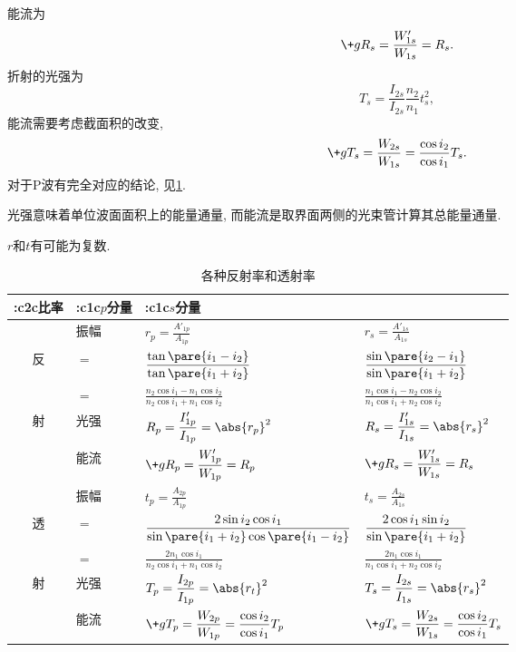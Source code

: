 \documentclass{ctexart}
\begin{document}
能流为
\[ \+gR_s = \frac{W'_{1s}}{W_{1s}} = R_s. \]
折射的光强为
\[ T_s = \frac{I_{2s}}{I_{2s}}{\frac{n_2}{n_1}}t_s^2, \]
能流需要考虑截面积的改变,
\[ \+gT_s = \frac{W_{2s}}{W_{1s}} = \frac{\cos i_2}{\cos i_1} T_s. \]
对于P波有完全对应的结论, 见\cref{table:各种反射率和透射率}.
\begin{pitfall}
    光强意味着单位波面面积上的能量通量, 而能流是取界面两侧的光束管计算其总能量通量.
\end{pitfall}
\begin{pitfall}
    $r$和$t$有可能为复数.
\end{pitfall}
\begin{table}[ht]
    \centering
    \begin{tabular}{c>{\centering\arraybackslash}m{1cm}>{\centering\arraybackslash}m{3.5cm}>{\centering\arraybackslash}m{3.5cm}}
        \toprule
        \+:c{2}{c}{比率} & \+:c{1}{c}{$p$分量} & \+:c{1}{c}{$s$分量} \\
        \midrule
        & 振幅 & $\displaystyle r_p = \frac{A'_{1p}}{A_{1p}}$ & $\displaystyle r_s = \frac{A'_{1s}}{A_{1s}}$ \\
        {反} & $=$ & $\displaystyle \frac{\tan\pare{i_1 - i_2}}{\tan\pare{i_1+i_2}}$ & $\displaystyle \frac{\sin \pare{i_2 - i_1}}{\sin \pare{i_1+i_2}}$ \\
        & $=$ & $\displaystyle \frac{n_2\cos i_1 - n_1\cos i_2}{n_2\cos i_1 + n_1\cos i_2}$ & $\displaystyle \frac{n_1\cos i_1 - n_2\cos i_2}{n_1\cos i_1 + n_2 \cos i_2}$ \\
        \cmidrule{2-4}
        {射} & 光强 & $\displaystyle R_p = \frac{I'_{1p}}{I_{1p}} = \abs{r_p}^2$ & $\displaystyle R_s = \frac{I'_{1s}}{I_{1s}} = \abs{r_s}^2$ \\
        \cmidrule{2-4}
         & 能流 & $\displaystyle \+gR_p = \frac{W'_{1p}}{W_{1p}} = R_p$ & $\displaystyle \+gR_s = \frac{W'_{1s}}{W_{1s}} = R_s$ \\
        \midrule
         & 振幅 & $\displaystyle t_p = \frac{A_{2p}}{A_{1p}}$ & $\displaystyle t_s = \frac{A_{2s}}{A_{1s}}$ \\
         {透} & $=$ & $\displaystyle \frac{2\sin i_2 \cos i_1}{\sin\pare{i_1 + i_2}\cos\pare{i_1 - i_2}}$ & $\displaystyle \frac{2\cos i_1\sin i_2}{\sin \pare{i_1+i_2}}$ \\
         & $=$ & $\displaystyle \frac{2n_1\cos i_1}{n_2\cos i_1 + n_1\cos i_2}$ & $\displaystyle \frac{2n_1 \cos i_1}{n_1\cos i_1 + n_2\cos i_2}$ \\
        \cmidrule{2-4}
        {射} & 光强 & $\displaystyle T_p = \frac{I_{2p}}{I_{1p}} = \abs{r_t}^2$ & $\displaystyle T_s = \frac{I_{2s}}{I_{1s}} = \abs{r_s}^2$ \\
        \cmidrule{2-4}
         & 能流 & $\displaystyle \+gT_p = \frac{W_{2p}}{W_{1p}} = \frac{\cos i_2}{\cos i_1}T_p$ & $\displaystyle \+gT_s = \frac{W_{2s}}{W_{1s}} = \frac{\cos i_2}{\cos i_1}T_s$ \\
        \bottomrule
    \end{tabular}
    \caption{各种反射率和透射率}
    \label{table:各种反射率和透射率}
\end{table}
\end{document}
